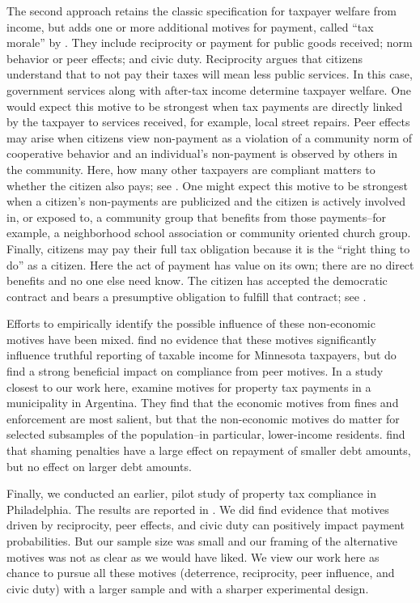 \documentclass[12pt]{article}
\begin{document}
The second approach retains the classic specification for taxpayer
welfare from income, but adds one or more additional motives for
payment, called ``tax morale'' by .  They include
reciprocity or payment for public goods received; norm behavior or
peer effects; and civic duty.  Reciprocity argues that citizens
understand that to not pay their taxes will mean less public services.
In this case, government services along with after-tax income
determine taxpayer welfare.  One would expect this motive to be
strongest when tax payments are directly linked by the taxpayer to
services received, for example, local street repairs.  Peer effects
may arise when citizens view non-payment as a violation of a community
norm of cooperative behavior and an individual's non-payment is
observed by others in the community.  Here, how many other taxpayers
are compliant matters to whether the citizen also pays; see
.  One might expect this motive to be strongest when
a citizen's non-payments are publicized and the citizen is actively
involved in, or exposed to, a community group that benefits from those
payments--for example, a neighborhood school association or community
oriented church group.  Finally, citizens may pay their full tax
obligation because it is the ``right thing to do'' as a citizen.  Here
the act of payment has value on its own; there are no direct benefits
and no one else need know.  The citizen has accepted the democratic
contract and bears a presumptive obligation to fulfill that contract;
see .

Efforts to empirically identify the possible influence of these
non-economic motives have been mixed.   find no
evidence that these motives significantly influence truthful reporting
of taxable income for Minnesota taxpayers, but 
do find a strong beneficial impact on compliance from peer motives.
In a study closest to our work here,  examine motives
for property tax payments in a municipality in Argentina.  They find
that the economic motives from fines and enforcement are most salient,
but that the non-economic motives do matter for selected subsamples of
the population--in particular, lower-income residents.  
find that shaming penalties have a large effect on repayment of smaller debt amounts, 
but no effect on larger debt amounts.

Finally, we conducted an earlier, pilot study of property tax
compliance in Philadelphia.  The results are reported in
.  We did find evidence that motives driven by
reciprocity, peer effects, and civic duty can positively impact
payment probabilities. But our sample size was small and our framing
of the alternative motives was not as clear as we would have liked. We
view our work here as chance to pursue all these motives (deterrence,
reciprocity, peer influence, and civic duty) with a larger sample and
with a sharper experimental design.
\end{document}
